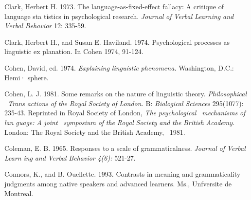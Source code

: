 \begin{styleStandard}
Clark, Herbert H. 1973. The language-as-fixed-effect fallacy: A critique of language sta\- tistics in psychological research. \textit{Journal}\textit{ }\textit{of}\textit{ }\textit{Verbal}\textit{ }\textit{Learning}\textit{ }\textit{and}\textit{ }\textit{Verbal}\textit{ }\textit{Behavior}\textit{ }12: 335-59.
\end{styleStandard}


\begin{styleStandard}
Clark, Herbert H., and Susan E. Haviland. 1974. Psychological processes as linguistic ex\- planation. In Cohen 1974, 91-124.
\end{styleStandard}


\begin{styleStandard}
Cohen, David, ed. 1974. \textit{Explaining}\textit{ }\textit{linguistic}\textit{ }\textit{phenomena.}\textit{ }Washington, D.C.: Hemi· sphere.
\end{styleStandard}


\begin{styleStandard}
Cohen, L. J. 1981. Some remarks on the nature of linguistic theory. \textit{Philosophical }\textit{\ }\textit{Trans\-}\textit{ }\textit{actions}\textit{ }\textit{of}\textit{ }\textit{the}\textit{ }\textit{Royal}\textit{ }\textit{Society}\textit{ }\textit{of}\textit{ }\textit{London.}\textit{ }B: \textit{Biological}\textit{ }\textit{Sciences}\textit{ }295(1077): 235-43. Reprinted in Royal Society of London, \textit{The}\textit{ }\textit{psychological }\textit{\ }\textit{mechanisms}\textit{ }\textit{of}\textit{ }\textit{lan\-}\textit{ }\textit{guage:}\textit{ }\textit{A}\textit{ }\textit{joint }\textit{\ }\textit{symposium}\textit{ }\textit{of}\textit{ }\textit{the}\textit{ }\textit{Royal}\textit{ }\textit{Society}\textit{ }\textit{and}\textit{ }\textit{the}\textit{ }\textit{British}\textit{ }\textit{Academy.}\textit{ }London: The Royal Society and the British Academy, \ 1981.
\end{styleStandard}


\begin{styleStandard}
Coleman, E. B. 1965. Responses to a scale of grammaticalness. \textit{Journal}\textit{ }\textit{of}\textit{ }\textit{Verbal}\textit{ }\textit{Learn\-}\textit{ }\textit{ing}\textit{ }\textit{and}\textit{ }\textit{Verbal}\textit{ }\textit{Behavior}\textit{ }\textit{4(6):}\textit{ }521-27.
\end{styleStandard}


\begin{styleStandard}
Connors, K., and B. Ouellette. 1993. Contrasts in meaning and grammaticality judgments among native speakers and advanced learners. Ms., Unfversite de Montreal.
\end{styleStandard}


